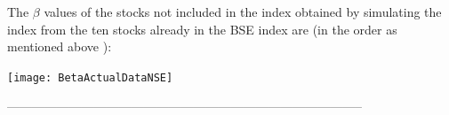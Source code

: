 \documentclass{article}
\begin{document}
The $\beta$ values of the stocks not included in the index obtained by simulating the index from the ten stocks already in the BSE index are (in the order as mentioned above ):\\
\begin{center}
\texttt{[image: BetaActualDataNSE]}
\end{center}
--------------------------------------------------------------------------------------
\end{document}
